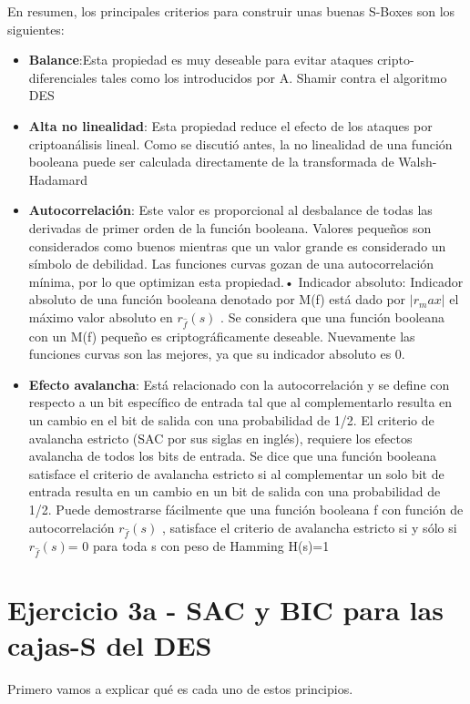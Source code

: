 \documentclass{apuntes}
\begin{document}
En resumen, los principales criterios para construir unas buenas S-Boxes son los siguientes:
\begin{itemize}
	

\item \textbf{Balance}:Esta propiedad es muy deseable para evitar ataques cripto-diferenciales tales como los
introducidos por A. Shamir contra el algoritmo DES
\item \textbf{Alta no linealidad}: Esta propiedad reduce el efecto de los ataques por criptoanálisis lineal.
Como se discutió antes, la no linealidad de una función booleana puede ser calculada
directamente de la transformada de Walsh-Hadamard
\item \textbf{Autocorrelación}: Este valor es proporcional al desbalance de todas las derivadas de primer
orden de la función booleana. Valores pequeños son considerados como buenos mientras que un
valor grande es considerado un símbolo de debilidad.
Las funciones curvas gozan de una autocorrelación mínima, por lo que optimizan esta propiedad.• Indicador absoluto: Indicador absoluto de una función booleana denotado por M(f) está dado por
$|r_max|$ el máximo valor absoluto en $r_{\widehat{f}}(s)$ . Se considera que una función booleana con un M(f)
pequeño es criptográficamente deseable. Nuevamente las funciones curvas son las mejores, ya
que su indicador absoluto es 0.
\item \textbf{Efecto avalancha}: Está relacionado con la autocorrelación y se define con respecto a un bit
específico de entrada tal que al complementarlo resulta en un cambio en el bit de salida con una
probabilidad de 1/2. El criterio de avalancha estricto (SAC por sus siglas en inglés), requiere los
efectos avalancha de todos los bits de entrada. Se dice que una función booleana satisface el
criterio de avalancha estricto si al complementar un solo bit de entrada resulta en un cambio en un
bit de salida con una probabilidad de 1/2. Puede demostrarse fácilmente que una función booleana
f con función de autocorrelación $r_{\widehat{f}}(s)$  , satisface el criterio de avalancha estricto si y sólo si $r_{\widehat{f}}(s)$= 0 para toda s con peso de Hamming H(s)=1
\end{itemize}
\newpage
\section{Ejercicio 3a - SAC y BIC para las cajas-S del DES}

Primero vamos a explicar qué es cada uno de estos principios.
\end{document}
